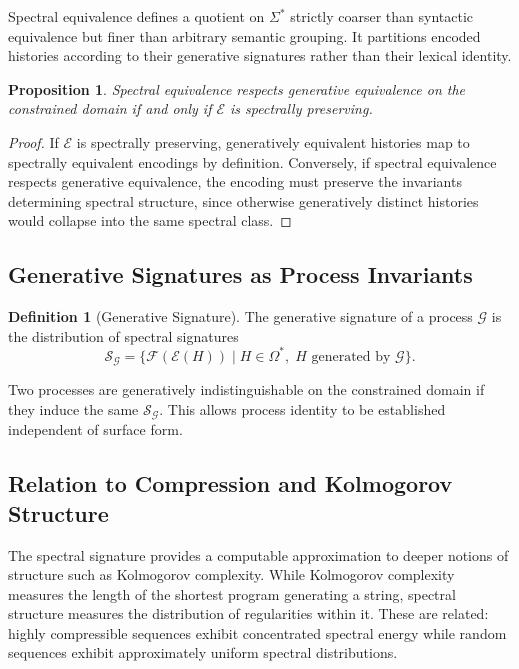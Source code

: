 \documentclass[12pt, a4paper]{article}
\theoremstyle{plain}
\newtheorem{proposition}[theorem]{Proposition}
\theoremstyle{definition}
\newtheorem{definition}[theorem]{Definition}
\theoremstyle{remark}
\begin{document}
Spectral equivalence defines a quotient on $\Sigma^*$ strictly coarser than syntactic equivalence but finer than arbitrary semantic grouping. It partitions encoded histories according to their generative signatures rather than their lexical identity.

\begin{proposition}
Spectral equivalence respects generative equivalence on the constrained domain if and only if $\mathcal{E}$ is spectrally preserving.
\end{proposition}

\begin{proof}
If $\mathcal{E}$ is spectrally preserving, generatively equivalent histories map to spectrally equivalent encodings by definition. Conversely, if spectral equivalence respects generative equivalence, the encoding must preserve the invariants determining spectral structure, since otherwise generatively distinct histories would collapse into the same spectral class.
\end{proof}

\subsection{Generative Signatures as Process Invariants}

\begin{definition}[Generative Signature]
The generative signature of a process $\mathcal{G}$ is the distribution of spectral signatures
\[
\mathcal{S}_{\mathcal{G}} = \{ \mathcal{F}(\mathcal{E}(H)) \mid H \in \Omega^*,\; H \text{ generated by } \mathcal{G} \}.
\]
\end{definition}

Two processes are generatively indistinguishable on the constrained domain if they induce the same $\mathcal{S}_{\mathcal{G}}$. This allows process identity to be established independent of surface form.

\subsection{Relation to Compression and Kolmogorov Structure}

The spectral signature provides a computable approximation to deeper notions of structure such as Kolmogorov complexity. While Kolmogorov complexity measures the length of the shortest program generating a string, spectral structure measures the distribution of regularities within it. These are related: highly compressible sequences exhibit concentrated spectral energy while random sequences exhibit approximately uniform spectral distributions.
\end{document}

